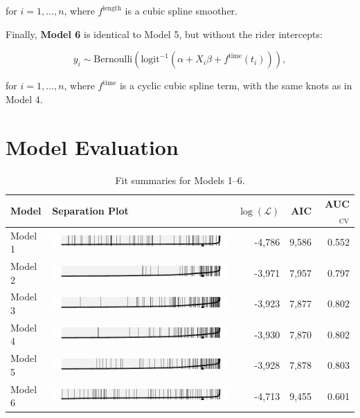 \documentclass[12pt,twoside]{reedthesis}
\begin{document}
  for \(i = 1, \ldots, n\), where \(f^\text{length}\) is a cubic spline
  smoother.
  
  Finally, \textbf{Model 6} is identical to Model 5, but without the rider
  intercepts:
  
  \begin{equation}
  y_i \sim \text{Bernoulli} \left(
  \text{logit}^{-1} \left( \alpha + X_i \beta + 
  f^\text{time} (t_i)  \right)
  \right),
  \end{equation}
  
  for \(i = 1, \ldots, n\), where \(f^\text{time}\) is a cyclic cubic
  spline term, with the same knots as in Model 4.
  
  \section{Model Evaluation}\label{model-evaluation}
  
  \begin{table}[htb]
  \centering
  \caption{Fit summaries for Models 1--6.\label{tab:modelfits}}
  \begin{tabular}{lm{4in}rrr}
  \toprule
  \textbf{Model} & \textbf{Separation Plot} & \textbf{$\log (\mathcal{L})$} & \textbf{AIC} &
  \textbf{AUC}$_{\text{CV}}$\footnotemark\\
  \midrule
  Model 1 & \includegraphics{figure/model1-sep.pdf}
  & -4,786 & 9,586 & 0.552\\
  Model 2 & \includegraphics{figure/model2-sep.pdf}
  & -3,971 & 7,957 & 0.797\\
  Model 3 & \includegraphics{figure/model3-sep.pdf}
  & -3,923 & 7,877 & 0.802\\
  Model 4 & \includegraphics{figure/model4-sep.pdf}
  & -3,930 & 7,870 & 0.802\\
  Model 5 & \includegraphics{figure/model5-sep.pdf}
  & -3,928 & 7,878 & 0.803\\
  Model 6 & \includegraphics{figure/model6-sep.pdf}
  & -4,713 & 9,455 & 0.601\\
  \bottomrule
  \end{tabular}
  \end{table}
  
\end{document}
